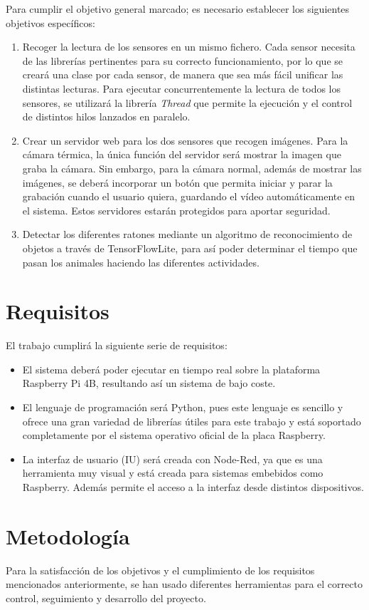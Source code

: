 Para cumplir el objetivo general marcado; es necesario establecer los siguientes objetivos específicos:
\begin{enumerate}
 \item Recoger la lectura de los sensores en un mismo fichero. Cada sensor necesita de las librerías pertinentes para su correcto funcionamiento, por lo que se creará una clase por cada sensor, de manera que sea más fácil unificar las distintas lecturas. Para ejecutar concurrentemente la lectura de todos los sensores, se utilizará la librería \textit{Thread} que permite la ejecución y el control de distintos hilos lanzados en paralelo.
 \item Crear un servidor web para los dos sensores que recogen imágenes. Para la cámara térmica, la única función del servidor será mostrar la imagen que graba la cámara. Sin embargo, para la cámara normal, además de mostrar las imágenes, se deberá incorporar un botón que permita iniciar y parar la grabación cuando el usuario quiera, guardando el vídeo automáticamente en el sistema. Estos servidores estarán protegidos para aportar seguridad.
 \item Detectar los diferentes ratones mediante un algoritmo de reconocimiento de objetos a través de TensorFlowLite, para así poder determinar el tiempo que pasan los animales haciendo las diferentes actividades.
\end{enumerate}

\section{Requisitos}
\label{sec:requisitos}
El trabajo cumplirá la siguiente serie de requisitos:
\begin{itemize}
 \item El sistema deberá poder ejecutar en tiempo real sobre la plataforma Raspberry Pi 4B, resultando así un sistema de bajo coste.
 \item El lenguaje de programación será Python, pues este lenguaje es sencillo y ofrece una gran variedad de librerías útiles para este trabajo y está soportado completamente por el sistema operativo oficial de la placa Raspberry.
 \item La interfaz de usuario (IU) será creada con Node-Red, ya que es una herramienta muy visual y está creada para sistemas embebidos como Raspberry. Además permite el acceso a la interfaz desde distintos dispositivos.
\end{itemize}

\section{Metodología}
\label{sec:metodologia}
Para la satisfacción de los objetivos y el cumplimiento de los requisitos mencionados anteriormente, se han usado diferentes herramientas para el correcto control, seguimiento y desarrollo del proyecto.\\

